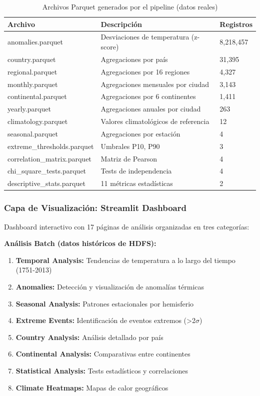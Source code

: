 \documentclass[12pt,a4paper]{scrartcl}
\begin{document}
\begin{table}[h]
\centering
\begin{tabular}{@{}lll@{}}
\toprule
\textbf{Archivo} & \textbf{Descripción} & \textbf{Registros} \\
\midrule
anomalies.parquet & Desviaciones de temperatura (z-score) & 8,218,457 \\
country.parquet & Agregaciones por país & 31,395 \\
regional.parquet & Agregaciones por 16 regiones & 4,327 \\
monthly.parquet & Agregaciones mensuales por ciudad & 3,143 \\
continental.parquet & Agregaciones por 6 continentes & 1,411 \\
yearly.parquet & Agregaciones anuales por ciudad & 263 \\
climatology.parquet & Valores climatológicos de referencia & 12 \\
seasonal.parquet & Agregaciones por estación & 4 \\
extreme\_thresholds.parquet & Umbrales P10, P90 & 3 \\
correlation\_matrix.parquet & Matriz de Pearson & 4 \\
chi\_square\_tests.parquet & Tests de independencia & 4 \\
descriptive\_stats.parquet & 11 métricas estadísticas & 2 \\
\bottomrule
\end{tabular}
\caption{Archivos Parquet generados por el pipeline (datos reales)}
\end{table}

\subsubsection{Capa de Visualización: Streamlit Dashboard}

Dashboard interactivo con 17 páginas de análisis organizadas en tres categorías:

\textbf{Análisis Batch (datos históricos de HDFS):}
\begin{enumerate}
    \item \textbf{Temporal Analysis:} Tendencias de temperatura a lo largo del tiempo (1751-2013)
    \item \textbf{Anomalies:} Detección y visualización de anomalías térmicas
    \item \textbf{Seasonal Analysis:} Patrones estacionales por hemisferio
    \item \textbf{Extreme Events:} Identificación de eventos extremos (>2$\sigma$)
    \item \textbf{Country Analysis:} Análisis detallado por país
    \item \textbf{Continental Analysis:} Comparativas entre continentes
    \item \textbf{Statistical Analysis:} Tests estadísticos y correlaciones
    \item \textbf{Climate Heatmaps:} Mapas de calor geográficos
\end{enumerate}
\end{document}
